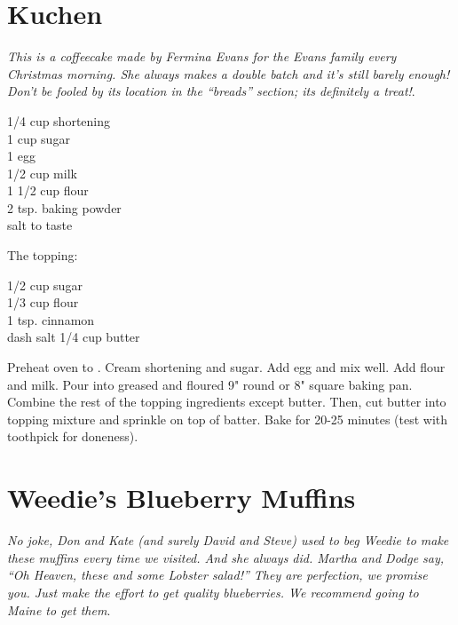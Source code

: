 \section{Kuchen}

\textit{This is a coffeecake made by Fermina Evans for the Evans family every
Christmas morning. She always makes a double batch and it's still barely
enough! Don't be fooled by its location in the ``breads'' section; its
definitely a treat!}.

\begin{ingredients}
1/4 cup shortening\\
1 cup sugar \\
1 egg \\
1/2 cup milk \\
1 1/2 cup flour \\
2 tsp. baking powder \\
salt to taste 
\end{ingredients}
The topping:
\begin{ingredients}
1/2 cup sugar \\
1/3 cup flour \\
1 tsp. cinnamon \\
dash salt
1/4 cup butter \\
\end{ingredients}
Preheat oven to . Cream shortening and sugar. Add egg and mix well.
Add flour and milk. Pour into greased and floured 9" round or 8" square baking
pan. Combine the rest of the topping ingredients except butter. Then, cut
butter into topping mixture and sprinkle on top of batter. Bake for 20-25
minutes (test with toothpick for doneness).

\section{Weedie's Blueberry Muffins}

\textit{No joke, Don and Kate (and surely David and Steve) used to beg Weedie to
make these muffins every time we visited. And she always did. Martha and Dodge
say, ``Oh Heaven, these and some Lobster salad!'' They are perfection, we
promise you. Just make the effort to get quality blueberries. We recommend
going to Maine to get them}.

